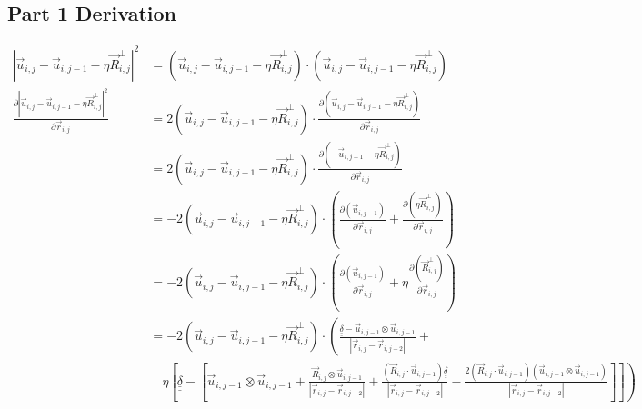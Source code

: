 \documentclass{article}
\renewcommand{\ij}{_{i,j}}
\newcommand{\ijj}{_{i,j-1}}
\newcommand{\ijjj}{_{i,j-2}}
\newcommand{\magn}[1]{\left\vert #1 \right\vert }
\renewcommand{\part}[2]{\frac{\partial #1 }{\partial #2}}
\newcommand{\ten}[1]{\underline{\underline{#1}}}
\newcommand{\rij}{\vec{r} \ij}
\newcommand{\Rij}{\vec{R} \ij}
\newcommand{\rijjj}{\vec{r} \ijjj}
\newcommand{\uij}{\vec{u} \ij}
\newcommand{\uijj}{\vec{u} \ijj}
\begin{document}
\subsection{Part 1 Derivation}

\begin{align*}
  \magn{\uij - \uijj - \eta \Rij^\perp}^2 
  &=
  \left(\uij - \uijj - \eta \Rij^\perp\right)
  \cdot 
  \left(\uij - \uijj - \eta \Rij^\perp\right)
  \\
  \part{\magn{\uij - \uijj - \eta \Rij^\perp}^2 }{
    \rij 
  }
  &=
  2\left(\uij - \uijj - \eta \Rij^\perp\right) \cdot
  \part{\left(\uij - \uijj - \eta \Rij^\perp\right)}{\rij}
  \\
  &=
  2\left(\uij - \uijj - \eta \Rij^\perp\right) \cdot
  \part{\left(- \uijj - \eta \Rij^\perp\right)}{\rij}
  \\
  &=
  -
  2\left(\uij - \uijj - \eta \Rij^\perp\right) \cdot
  \left(
  \part{\left(\uijj \right)}{\rij}
  +
  \part{\left( \eta \Rij^\perp\right)}{\rij}
  \right)
  \\
  &=
  -
  2\left(\uij - \uijj - \eta \Rij^\perp\right) \cdot
  \left(
  \part{\left(\uijj \right)}{\rij}
  +
  \eta
  \part{\left( \Rij^\perp\right)}{\rij}
  \right)
  \\
  &=
  -
  2\left(\uij - \uijj - \eta \Rij^\perp\right) \cdot
  \left(
  \frac{\ten{\delta} - \uijj \otimes \uijj}{\magn{\rij - \rijjj}}
  + \right. \\
  & \quad 
  \left. 
  \eta
  \left[
  \ten{\delta} 
  -
  \left[
  \uijj \otimes \uijj
  + 
  \frac{\Rij \otimes \uijj }{\magn{\rij - \rijjj}} 
  +
  \frac{ \left( 
    \Rij \cdot \uijj
    \right) \ten{\delta}}{\magn{\rij - \rijjj}}
  -
  \frac{
    2 \left(
      \Rij \cdot \uijj 
    \right)
    \left(\uijj \otimes \uijj 
    \right)
    }{\magn{\rij - \rijjj}}
  \right]
  \right]
  \right)
\end{align*}
\end{document}
